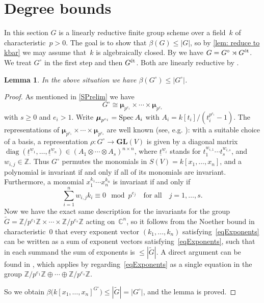 \documentclass[reqno]{amsart}
\newcommand{\ZZ}{{\mathbb{Z}}}
\newcommand{\CC}{{\mathbb{C}}}
\newcommand{\Spec}{{\rm Spec}\:}
\newcommand{\GL}{{\mathbf{GL}}}
\newcommand{\et}{{\rm \acute{e}t}}
\newcommand{\bmu}{\boldsymbol{\mu}}
\DeclareMathOperator{\diag}{diag}
\theoremstyle{definition}
\theoremstyle{plain}
\newtheorem{Lemma}[Definition]{Lemma}
\begin{document}
\section{Degree bounds} \label{sNoether}

In this section $G$ is a linearly reductive finite group scheme over
a field~$k$ of characteristic~$p > 0$. The goal
is to show that $\beta(G) \le |G|$, so by \cref{lem: reduce to kbar} we may assume
that~$k$ is algebraically closed. By
\cite[Section~(2.10)]{Hashimoto} we have
$G = G^\circ\rtimes G^\et$. We treat $G^\circ$ in the first step and
then $G^\et$. Both are linearly reductive by
\cite[Lemma~2.2]{Hashimoto}.

\begin{Lemma} \label{lG0}%
  In the above situation we have $\beta(G^\circ) \le |G^\circ|$.
\end{Lemma}

\begin{proof}
  As mentioned in \cref{SPrelim} we have
  \[
    G^\circ \cong \bmu_{p^{e_1}} \times \cdots \times \bmu_{p^{e_s}}
  \]
  with $s \ge 0$ and $e_i > 1$. Write $\bmu_{p^{e_i}} = \Spec A_i$
  with $A_i = k[t_i]/(t_i^{p^{e_i}} - 1)$. The representations of
  $\bmu_{p^{e_1}} \times \cdots \times \bmu_{p^{e_s}}$ are well known
  (see, e.g. \cite[Section~2.6]{Hashimoto}): with a suitable choice of
  a basis, a representation $\rho:G^\circ\to\GL(V)$ is given by a
  diagonal matrix
  $\diag(\underline{t}^{\underline{w}_1},\ldots,\underline{t}^{\underline{w}_n})
  \in (A_1 \otimes \cdots \otimes A_s)^{n \times n}$, where
  $\underline{t}^{\underline{w}_i}$ stands for
  $t_1^{w_{i,1}} \cdots t_s^{w_{i,s}}$, and $w_{i,j} \in \ZZ$. Thus
  $G^\circ$ permutes the monomials in $S(V) = k[x_1,\ldots,x_n]$,
  and a polynomial is invariant if and only if all of its monomials
  are invariant. Furthermore, a monomial $x_1^{k_1} \cdots x_n^{k_n}$
  is invariant if and only if
  \begin{equation} \label{eqExponents}%
    \sum_{i=1}^n w_{i,j} k_i \equiv 0 \mod p^{e_j} \quad \text{for
      all} \quad j = 1,\ldots,s.
  \end{equation}
  Now we have the exact same description for the invariants for the
  group $\widetilde G = \ZZ/{p^{e_1}}\ZZ \times \cdots \times\ZZ/{p^{e_s}}\ZZ$
  acting on~$\CC^n$, so it follows from the Noether bound in
  characteristic~$0$ that every exponent vector $(k_1,\ldots,k_n)$
  satisfying~\cref{eqExponents} can be written as a sum of
  exponent vectors satisfying~\cref{eqExponents}, such that in each summand the sum of exponents is
  $\le |\widetilde G|$. A direct argument can be found in
  \cite[Lemma~2.1]{Schmid}, which applies by
  regarding~\cref{eqExponents} as a single equation in the group
  $\ZZ/p^{e_1} \ZZ \oplus \cdots \oplus \ZZ/p^{e_s} \ZZ$.

  So we obtain
  $\beta\bigl(k[x_1,\ldots,x_n]^{G^\circ}\bigr) \le |\widetilde G| =
  |G^\circ|$, and the lemma is proved.
\end{proof}
\end{document}
